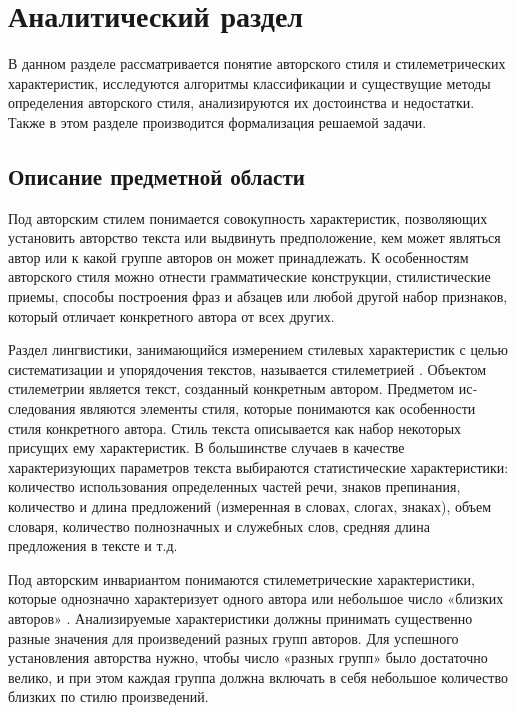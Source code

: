 \chapter{Аналитический раздел}
\label{cha:analytical}

В данном разделе рассматривается понятие авторского стиля и стилеметрических характеристик, исследуются алгоритмы классификации и существущие методы определения авторского стиля, анализируются их достоинства и недостатки. Также в этом разделе производится формализация решаемой задачи.

\section{Описание предметной области}

Под авторским стилем понимается совокупность характеристик, позволяющих установить авторство текста или выдвинуть предположение, кем может являться автор или к какой группе авторов он может принадлежать. К особенностям авторского стиля можно отнести грамматические конструкции, стилистические приемы, способы построения фраз и абзацев или любой другой набор признаков, который отличает конкретного автора от всех других. 

Раздел лингвистики, зани­мающийся измерением стилевых характеристик с целью систематиза­ции и упорядочения текстов, называется стилеметрией \cite{stylometry}. Объектом стилеметрии является текст, созданный конкретным ав­тором. Предметом ис­следования являются элементы стиля, которые понимаются как осо­бенности стиля конкретного автора. Стиль текста описывается как набор некоторых присущих ему  характеристик. В большинстве случаев в качестве характеризующих параметров текста выбираются статистические характеристики: количество использования определенных частей речи, знаков препинания, количество и длина предложений (измеренная в словах, слогах, знаках), объем словаря, количество полнозначных и служебных слов, средняя длина предложения в тексте и т.д.

Под авторским инвариантом понимаются стилеметрические характеристики, которые однозначно характеризует одного автора или небольшое число «близких авторов» \cite{invariant}. Анализируемые характеристики должны принимать существенно разные значения для произведений разных групп авторов. Для успешного установления авторства нужно, чтобы число «разных групп» было достаточно велико, и при этом каждая группа должна включать в себя небольшое количество близких по стилю произведений.

